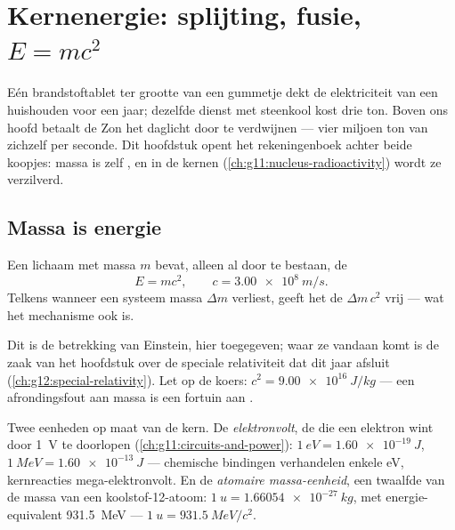\chapter{Kernenergie: splijting, fusie, $E=mc^2$}\label{ch:g12:nuclear-energy}

Eén brandstoftablet ter grootte van een gummetje dekt de elektriciteit van een
huishouden voor een jaar; dezelfde dienst met steenkool kost drie ton. Boven
ons hoofd betaalt de Zon het daglicht door te verdwijnen --- vier miljoen ton
van zichzelf per seconde. Dit hoofdstuk opent het rekeningenboek achter beide
koopjes: massa is zelf , en in de kernen
(\cref{ch:g11:nucleus-radioactivity}) wordt ze verzilverd.

\section{Massa is energie}

\begin{theorem}\label{thm:g12:nuclear-energy:emc2}
Een lichaam met massa $m$ bevat, alleen al door te bestaan, de 
\[
E = m c^2, \qquad c = \qty{3.00e8}{m/s}.
\]
Telkens wanneer een systeem massa $\Delta m$ verliest, geeft het de 
$\Delta m\, c^2$ vrij --- wat het mechanisme ook is.
\end{theorem}
\admitted

\begin{remark}[Einstein, 1905]\label{rem:g12:nuclear-energy:einstein}
Dit is de betrekking van Einstein, hier toegegeven; waar ze vandaan komt is de
zaak van het hoofdstuk over de speciale relativiteit dat dit jaar afsluit
(\cref{ch:g12:special-relativity}). Let op de koers:
$c^2 = \qty{9.00e16}{J/kg}$ --- een afrondingsfout aan massa is een fortuin
aan .
\end{remark}

\begin{definition}\label{def:g12:nuclear-energy:units}
Twee eenheden op maat van de kern. De
\emph{elektronvolt}, de  die een elektron wint door
\qty{1}{V} te doorlopen (\cref{ch:g11:circuits-and-power}):
$\qty{1}{eV} = \qty{1.60e-19}{J}$, $\qty{1}{MeV} = \qty{1.60e-13}{J}$ ---
chemische bindingen verhandelen enkele \unit{eV}, kernreacties
mega-elektronvolt. En de
\emph{atomaire massa-eenheid}, een twaalfde van
de massa van een koolstof-12-atoom:
$\qty{1}{u} = \qty{1.66054e-27}{kg}$, met energie-equivalent
\qty{931.5}{MeV} --- $\qty{1}{u} = \qty{931.5}{MeV}/c^2$.
\end{definition}

